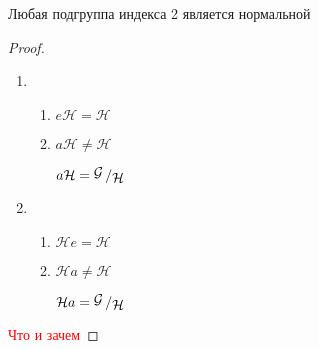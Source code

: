 \documentclass[../main/document.tex]{subfiles}
\begin{document}
\begin{thm}
Любая подгруппа индекса 2 является нормальной
\begin{proof}
\begin{enumerate}
\item \begin{enumerate}
\item $e\mathcal{H}=\mathcal{H}$
\item $a\mathcal{H}\neq\mathcal{H}$

$a\mathcal{H}=\bigslant{\mathcal{G}}{\mathcal{H}}$
\end{enumerate}
\item \begin{enumerate}
\item $\mathcal{H}e=\mathcal{H}$
\item $\mathcal{H}a\neq\mathcal{H}$

$\mathcal{H}a=\bigslant{\mathcal{G}}{\mathcal{H}}$
\end{enumerate}
\end{enumerate}
\textcolor{red}{Что и зачем}
\end{proof}
\end{thm}
\end{document}
